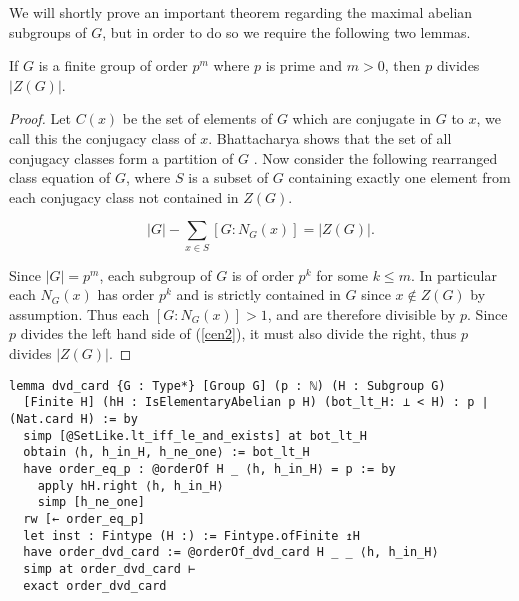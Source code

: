 We will shortly prove an important theorem regarding the maximal abelian subgroups of $G$, but in order to do so we require the following two lemmas. \\

\begin{lemma}
  \label{IsElementaryAbelian.dvd_card}
  \leanok
If $G$ is a finite group of order $p^m$ where $p$ is prime and $m > 0$, then $p$ divides $|Z(G)|$. 
\end{lemma}
\begin{proof}
Let $C(x)$ be the set of elements of $G$ which are conjugate in $G$ to $x$, we call this the conjugacy class of $x$. Bhattacharya shows that the set of all conjugacy classes form a partition of $G$ \cite[p.112]{bhattacharya}. 
Now consider the following rearranged class equation of $G$, where $S$ is a subset of $G$ containing exactly one element from each conjugacy class not contained in $Z(G)$. 
 
\begin{equation} \label{cen2}
|G| - \sum_{x \in S} [G:N_G(x)] = |Z(G)|.
\end{equation}

Since $|G| = p^m$, each subgroup of $G$ is of order $p^k$ for some $k \leq m$. In particular each $N_G(x)$ has order $p^k$ and is strictly contained in $G$ since $x \not \in Z(G)$ by assumption. Thus each $[G:N_G(x)] > 1$, and are therefore divisible by $p$. Since $p$ divides the left hand side of (\ref{cen2}), it must also divide the right, thus $p$ divides $|Z(G)|$. 

\end{proof}
\begin{footnotesize}
\begin{verbatim}
lemma dvd_card {G : Type*} [Group G] (p : ℕ) (H : Subgroup G)
  [Finite H] (hH : IsElementaryAbelian p H) (bot_lt_H: ⊥ < H) : p ∣ (Nat.card H) := by
  simp [@SetLike.lt_iff_le_and_exists] at bot_lt_H
  obtain ⟨h, h_in_H, h_ne_one⟩ := bot_lt_H
  have order_eq_p : @orderOf H _ ⟨h, h_in_H⟩ = p := by
    apply hH.right ⟨h, h_in_H⟩
    simp [h_ne_one]
  rw [← order_eq_p]
  let inst : Fintype (H :) := Fintype.ofFinite ↥H
  have order_dvd_card := @orderOf_dvd_card H _ _ ⟨h, h_in_H⟩
  simp at order_dvd_card ⊢
  exact order_dvd_card
\end{verbatim}
\end{footnotesize}


